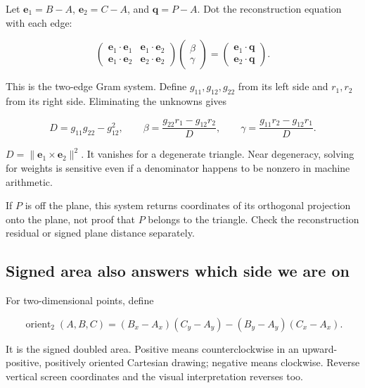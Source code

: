 \hypertarget{01-foundations-i-ch018-derive-the-weights-in-a-tilted-triangle}{}

Let \(\mathbf e_1=B-A\), \(\mathbf e_2=C-A\), and \(\mathbf q=P-A\). Dot the reconstruction equation with each edge:

\[
\begin{pmatrix}
\mathbf e_1\cdot\mathbf e_1&\mathbf e_1\cdot\mathbf e_2\\
\mathbf e_1\cdot\mathbf e_2&\mathbf e_2\cdot\mathbf e_2
\end{pmatrix}
\begin{pmatrix}\beta\\\gamma\end{pmatrix}
=\begin{pmatrix}\mathbf e_1\cdot\mathbf q\\\mathbf e_2\cdot\mathbf q\end{pmatrix}.
\]

This is the two-edge Gram system. Define \(g_{11},g_{12},g_{22}\) from its left side and \(r_1,r_2\) from its right side. Eliminating the unknowns gives

\[
D=g_{11}g_{22}-g_{12}^2,
\qquad
\beta=\frac{g_{22}r_1-g_{12}r_2}{D},
\qquad
\gamma=\frac{g_{11}r_2-g_{12}r_1}{D}.
\]

\(D=\|\mathbf e_1\times\mathbf e_2\|^2\). It vanishes for a degenerate triangle. Near degeneracy, solving for weights is sensitive even if a denominator happens to be nonzero in machine arithmetic.

If \(P\) is off the plane, this system returns coordinates of its orthogonal projection onto the plane, not proof that \(P\) belongs to the triangle. Check the reconstruction residual or signed plane distance separately.

\subsection{Signed area also answers which side we are on}\label{01-foundations-i-ch018-signed-area-also-answers-which-side-we-are-on}

\hypertarget{01-foundations-i-ch018-signed-area-also-answers-which-side-we-are-on}{}

For two-dimensional points, define

\[
\operatorname{orient}_2(A,B,C)
=(B_x-A_x)(C_y-A_y)-(B_y-A_y)(C_x-A_x).
\]

It is the signed doubled area. Positive means counterclockwise in an upward-positive, positively oriented Cartesian drawing; negative means clockwise. Reverse vertical screen coordinates and the visual interpretation reverses too.

